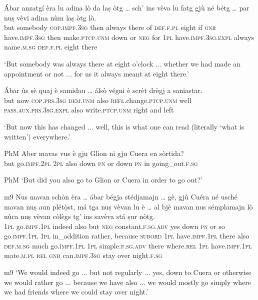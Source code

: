 \begin{linenumbers}
	\gll Ábar anzatgí èra lu adina lò da laṣ òtg … sch’ ins vèva lu fatg gjù né bétg … par nuṣ vèvi adina nùm laṣ òtg lò.   \\
	but somebody \textsc{cop.impf.3sg} then always there of \textsc{def.f.pl} eight {} if \textsc{gnr} have.\textsc{impf.3sg} then make.\textsc{ptcp.unm} down or \textsc{neg} {} for \textsc{1pl} have.\textsc{impf.3sg.expl} always name.\textsc{m.sg} \textsc{def.f.pl} eight there\\
\end{linenumbers}
\medskip
\glt `But somebody was always there at eight o'clock ... whether we had made an appointment or not ... for us it always meant at eight there.'
\medskip

\largerpage
\begin{linenumbers}
	\gll Ábar ùs ṣè quaj è samidau … álsò végni è scrèt drègj a saniastar.   \\
	but now \textsc{cop.prs.3sg} \textsc{dem.unm} also \textsc{refl}.change.\textsc{ptcp.unm} {} well \textsc{pass.aux.prs.3sg.expl} also write\textsc{.ptcp.unm} right and left\\
\end{linenumbers}
\medskip
\glt `But now this has changed ... well, this is what one can read (literally `what is written') everywhere.'
\medskip

\begin{linenumbers}
	\gll  {\ob}PhM{\cb} Aber mavas vus è gju Glion ni gju Cuera en sòrtida?  \\
	{} but go.\textsc{impf.2pl} \textsc{2pl} also down \textsc{pn} or down \textsc{pn} in going\_out.\textsc{f.sg}\\
\end{linenumbers}
\medskip
\glt {\ob}PhM{\cb} `But did you also go to Glion or Cuera in order to go out?'

\clearpage

\begin{linenumbers}
	\gll {\ob}m9{\cb} Nus mavan schòn èra … ábar bégja stédjamajn … gè, gjù Cuéra né usché mavan nuṣ aun plétò̱st, má tga nuṣ vèvan lu è … al bjè mavan nus sémplamajn lò nùca nuṣ vèvan còlègs tg’ ins savèva stá ṣur nòtg.   \\
{} \textsc{1pl} go.\textsc{impf.1pl} indeed also {} but \textsc{neg} constant.\textsc{f.sg.adv} {} yes down \textsc{pn} or so go.\textsc{impf.1pl} \textsc{1pl} in\_addition rather, because \textsc{subord} \textsc{1pl} have.\textsc{impf.1pl} there also {} \textsc{def.m.sg} much go.i\textsc{mpf.1pl} \textsc{1pl} simple.\textsc{f.sg.adv} there where.\textsc{rel} \textsc{1pl} have.\textsc{impf.1pl} mate.\textsc{m.pl} \textsc{rel} \textsc{gnr} can.\textsc{impf.3sg} stay over night.\textsc{f.sg}	\\
\end{linenumbers}
\medskip
\glt {\ob}m9{\cb} `We would indeed go ... but not regularly ... yes, down to Cuera or otherwise we would rather go ... because we have also ... we would mostly go simply where we had friends where we could stay over night.'
\medskip

